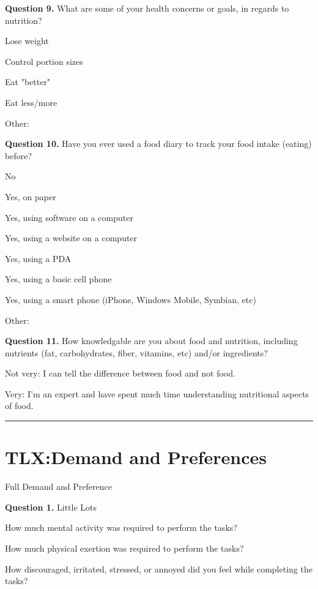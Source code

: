 \noindent\textbf{Question 9.}
What are some of your health concerns or goals, in regards to nutrition?

\begin{itemize*}
\item	Lose weight
\item	Control portion sizes
\item	Eat "better"
\item	Eat less/more
\item	Other:  
\end{itemize*}

\noindent\textbf{Question 10.}
Have you ever used a food diary to track your food intake (eating) before?

\begin{itemize*}
\item	No
\item	Yes, on paper
\item	Yes, using software on a computer
\item	Yes, using a website on a computer
\item	Yes, using a PDA
\item	Yes, using a basic cell phone
\item	Yes, using a smart phone (iPhone, Windows Mobile, Symbian, etc)
\item	Other:  
\end{itemize*}


\noindent\textbf{Question 11.}
How knowledgable are you about food and nutrition, including nutrients (fat, carbohydrates, fiber, vitamins, etc) and/or ingredients? 
\begin{itemize*}
\item	Not very: I can tell the difference between food and not food.
\item 
\item 
\item	Very: I'm an expert and have spent much time understanding nutritional aspects of food.
\end{itemize*}


\hrule 
\section{TLX:Demand and Preferences}
Full
Demand and Preference


\noindent\textbf{Question 1.}
 	Little						Lots
\begin{itemize*}
\item How much mental activity was required to perform the tasks?
\item How much physical exertion was required to perform the tasks?
\item How discouraged, irritated, stressed, or annoyed did you feel while completing the tasks?
\end{itemize*}


